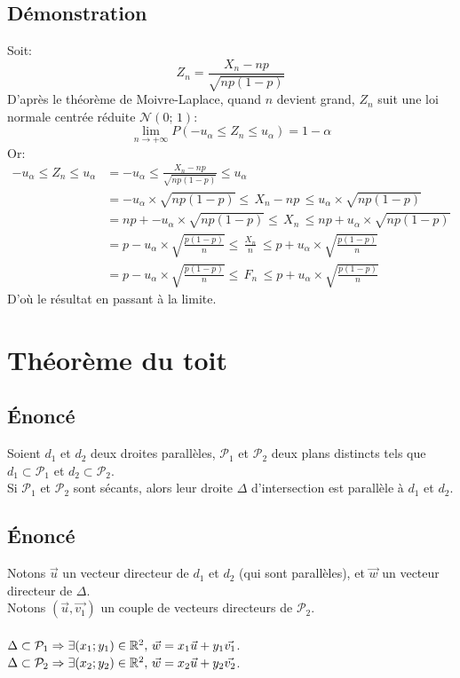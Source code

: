 \documentclass[12px]{article}
\begin{document}
	\subsection{Démonstration}
	Soit:
	\begin{displaymath}
		Z_n= \frac{X_n-np}{\sqrt{np(1-p)}}
	\end{displaymath}
	D'après le théorème de Moivre-Laplace, quand $n$ devient grand, $Z_n$ suit une loi normale centrée réduite $\mathcal{N}(0;\, 1):$\\
	\begin{displaymath}
		\lim\limits_{n\rightarrow +\infty}P(-u_\alpha\leq Z_n \leq u_\alpha) = 1-\alpha
	\end{displaymath}
	Or:
	\begin{align*}
		-u_\alpha\leq Z_n \leq u_\alpha
		&= -u_\alpha\leq \frac{X_n-np}{\sqrt{np(1-p)}} \leq u_\alpha\\
		&= -u_\alpha\times\sqrt{np(1-p)}\leq\, X_n-np\, \leq u_\alpha\times\sqrt{np(1-p)}\\
		&= np+-u_\alpha\times\sqrt{np(1-p)}\leq\, X_n\, \leq np+u_\alpha\times\sqrt{np(1-p)}\\
		&= p-u_\alpha\times\sqrt{ \frac{p(1-p)}{n} }\leq\, \frac{X_n}{n}\, \leq p+u_\alpha\times\sqrt{ \frac{p(1-p)}{n} }\\
		&= p-u_\alpha\times\sqrt{ \frac{p(1-p)}{n} }\leq\, F_n\, \leq p+u_\alpha\times\sqrt{ \frac{p(1-p)}{n} }
	\end{align*}
	D'où le résultat en passant à la limite.
	
	\section{Théorème du toit}
	
	\subsection{\'Enoncé}
	Soient $d_1$ et $d_2$ deux droites parallèles, $\mathcal{P}_1$ et $\mathcal{P}_2$ deux plans distincts tels que $d_1 \subset \mathcal{P}_1$ et $d_2 \subset \mathcal{P}_2$.\\
	Si $\mathcal{P}_1$ et $\mathcal{P}_2$ sont sécants, alors leur droite $\Delta$ d'intersection est parallèle à $d_1$ et $d_2$.
	
	\subsection{\'Enoncé}
	Notons $\vec{u}$ un vecteur directeur de $d_1$ et $d_2$ (qui sont parallèles), et $\vec{w}$ un vecteur directeur de $\Delta$.\\
	Notons $(\vec{u}, \vec{v_1})$ un couple de vecteurs directeurs de $\mathcal{P}_2$.\\\\
	$\Delta \subset \mathcal{P}_1 \Rightarrow \exists (x_1; y_1) \in \mathbb{R}^2, \, \vec{w} = x_1\vec{u} + y_1\vec{v_1}$.\\	
	$\Delta \subset \mathcal{P}_2 \Rightarrow \exists (x_2; y_2) \in \mathbb{R}^2, \, \vec{w} = x_2\vec{u} + y_2\vec{v_2}$.\\
	
\end{document}
